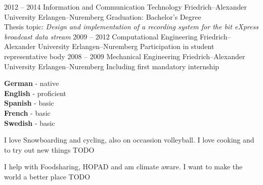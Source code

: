 \documentclass[9pt]{developercv} %
\begin{document}


\begin{entrylist}
	\entry
		{2012 -- 2014}
		{Information and Communication Technology}
		{Friedrich–Alexander University Erlangen–Nuremberg}
		{
      Graduation: Bachelor's Degree\\
      Thesis topic: \textit{Design and implementation of a recording system for the bit eXpress broadcast data stream}
      }
	\entry
		{2009 -- 2012}
		{Computational Engineering}
		{Friedrich–Alexander University Erlangen–Nuremberg}
		{Participation in student representative body}
	\entry
		{2008 -- 2009}
		{Mechanical Engineering}
		{Friedrich–Alexander University Erlangen–Nuremberg}
		{Including first mandatory internship}
\end{entrylist}


\begin{minipage}[t]{0.3\textwidth}
	\vspace{-\baselineskip} %

	
	\textbf{German} - native\\
	\textbf{English} - proficient\\
	\textbf{Spanish} - basic\\
	\textbf{French} - basic\\
	\textbf{Swedish} - basic
\end{minipage}
\hfill
\begin{minipage}[t]{0.3\textwidth}
	\vspace{-\baselineskip} %
	
	
	I love Snowboarding and cycling, also on occassion volleyball. I love cooking and to try out new things TODO
\end{minipage}
\hfill
\begin{minipage}[t]{0.3\textwidth}
	\vspace{-\baselineskip} %
	
	
	I help with Foodsharing, HOPAD and am climate aware. I want to make the world a better place TODO
\end{minipage}



\end{document}
